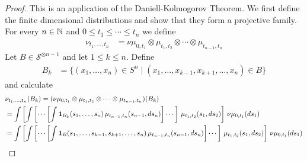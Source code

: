\begin{proof}
This is an application of the Daniell-Kolmogorov Theorem.  We first
define the finite dimensional distributions and show that they form a
projective family.  For every $n \in \mathbb{N}$ and $0 \leq t_1 \leq
\dotsb \leq t_n$ we define
\begin{align*}
\nu_{t_1, \dotsc, t_n} &= \nu \mu_{0,t_1} \otimes \mu_{t_1, t_2}
\otimes \dotsb \otimes \mu_{t_{n-1}, t_n}
\end{align*}
Let $B \in \mathcal{S}^{\otimes n-1}$ and let $1 \leq k \leq n$.
Define
\begin{align*}
B_k &= \lbrace (x_1, \dotsc, x_n) \in S^n \mid (x_1, \dotsc, x_{k-1},
x_{k+1}, \dotsc, x_n) \in B \rbrace
\end{align*}
and calculate
\begin{align*}
&\nu_{t_1, \dotsc, t_n}(B_k) = ( \nu \mu_{0,t_1} \otimes \mu_{t_1, t_2}
\otimes \dotsb \otimes \mu_{t_{n-1}, t_n})(B_k) \\
&=\int \left [ \int \left[ \dotsb \left [ \int \textbf{1}_{B_k}(s_1,
    \dotsc, s_n) \, \mu_{t_{n-1},t_n}(s_{n-1}, ds_n) \right] \dotsb
\right] \, \mu_{t_1, t_2}(s_1, ds_2) \right ] \, \nu \mu_{0,
t_1}(ds_1) \\
&=\int \left [ \int \left[ \dotsb \left [ \int \textbf{1}_{B}(s_1,
    \dotsc, s_{k-1}, s_{k+1}, \dotsc, s_n) \, \mu_{t_{n-1},t_n}(s_{n-1}, ds_n) \right] \dotsb \right] \, \mu_{t_1, t_2}(s_1, ds_2) \right ] \, \nu \mu_{0, t_1}(ds_1)
\end{align*}


\end{proof}
